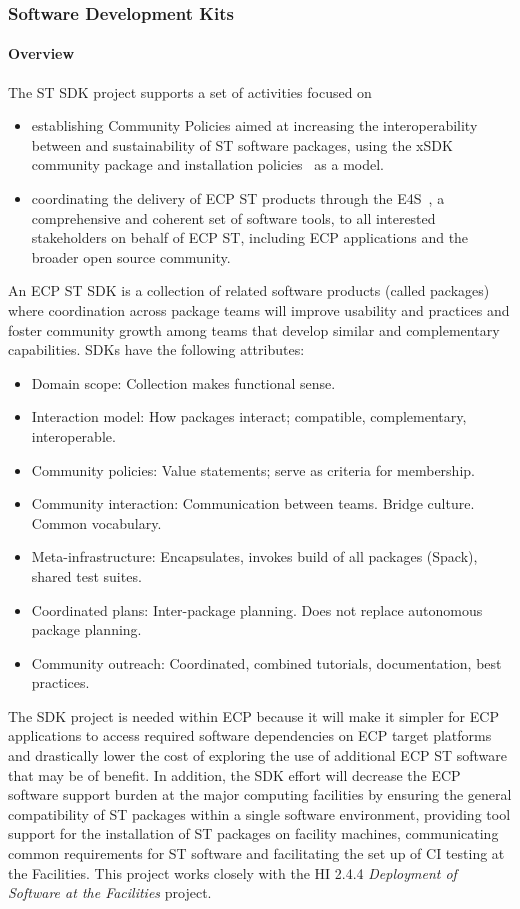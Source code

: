 \subsubsection{ Software Development Kits} \label{subsubsect:ecosystem-sdk}

\paragraph{Overview} The ST SDK project supports a set of activities focused on 
\begin{itemize}
\item establishing Community Policies aimed at increasing the interoperability between and sustainability of ST software packages, using the xSDK~\cite{xsdk:homepage} community package and installation policies~\cite{xsdk-policies:homepage} as a model.
\item coordinating the delivery of ECP ST products through the E4S~\cite{e4s:homepage}, a comprehensive and coherent set of software tools, to all interested stakeholders on behalf of ECP ST, including ECP applications and the broader open source community.
\end{itemize}

An ECP ST SDK is a collection of related software products (called packages) where coordination across package teams will improve usability and practices and foster community growth among teams that develop similar and complementary capabilities.  SDKs have the following attributes:
\begin{itemize}
\item Domain scope: Collection makes functional sense.
\item Interaction model: How packages interact; compatible, complementary, interoperable.
\item Community policies: Value statements; serve as criteria for membership.
\item Community interaction: Communication between teams. Bridge culture. Common vocabulary.
\item Meta-infrastructure: Encapsulates, invokes build of all packages (Spack), shared test suites.
\item Coordinated plans: Inter-package planning. Does not replace autonomous package planning.
\item Community outreach: Coordinated, combined tutorials, documentation, best practices.
\end{itemize}

The SDK project is needed within ECP because it will make it simpler for ECP applications to access required software dependencies on ECP target platforms and drastically lower the cost of exploring the use of additional ECP ST software that may be of benefit. In addition, the SDK effort will decrease the ECP software support burden at the major computing facilities by ensuring the general compatibility of ST packages within a single software environment, providing tool support for the installation of ST packages on facility machines, communicating common requirements for ST software and facilitating the set up of CI testing at the Facilities. This project works closely with the HI 2.4.4 \textit{Deployment of Software at the Facilities} project.

